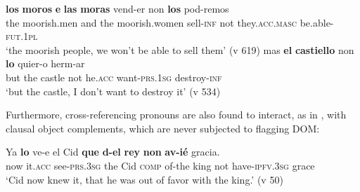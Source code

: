 \documentclass[output=paper]{LSP/langsci}
\begin{document}
\begin{exe}
\ex%
\label{04-me-ex:7}
\begin{xlist}
\ex%
\label{04-me-ex:7a}
\gll \textbf{los} \textbf{moros} \textbf{e} \textbf{las} \textbf{moras} {\textbar} vend-er non \textbf{los} pod-remos\\
 the moorish.men and the moorish.women { } sell-\textsc{inf} not they.\textsc{acc.masc} be.able-\textsc{fut.1pl}\\
\glt ‘the moorish people, we won’t be able to sell them’ (v 619)
\ex%
\label{04-me-ex:7b}
\gll mas \textbf{el} \textbf{castiello} {\textbar} non \textbf{lo} quier-o herm-ar\\
 but the castle { } not he.\textsc{acc} want-\textsc{prs.1sg} destroy-\textsc{inf}\\
\glt ‘but the castle, I don’t want to destroy it’ (v 534)
\end{xlist}
\end{exe}

 Furthermore, cross-referencing pronouns are also found to interact, as in , with clausal object complements, which are never subjected to flagging DOM:

\begin{exe}
\ex%
\label{04-me-ex:8}
\gll Ya \textbf{lo} ve-e el Cid {\textbar} \textbf{que} \textbf{d-el} \textbf{rey} \textbf{non} \textbf{av-ié} gracia.\\
now it.\textsc{acc} see-\textsc{prs.3sg} the Cid { } \textsc{comp} of-the king not have-\textsc{ipfv.3sg} grace\\
\glt ‘Cid now knew it, that he was out of favor with the king.’ (v 50)
\end{exe}
\end{document}
